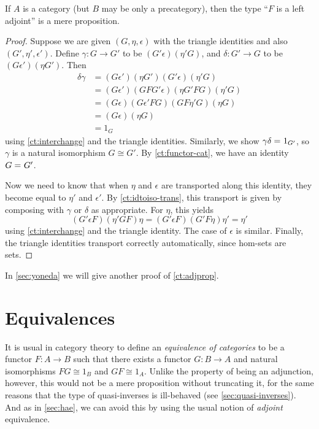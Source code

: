 \begin{lem}\label{ct:adjprop}
  If $A$ is a category (but $B$ may be only a precategory), then the type ``$F$ is a left adjoint'' is a mere proposition.
\end{lem}
\begin{proof}
  Suppose we are given $(G,\eta,\epsilon)$ with the triangle identities and also $(G',\eta',\epsilon')$.
  Define $\gamma:G\to G'$ to be $(G'\epsilon)(\eta' G)$, and $\delta:G'\to G$ to be $(G\epsilon')(\eta G')$.
  Then
  \begin{align*}
    \delta\gamma &=
    (G\epsilon')(\eta G')(G'\epsilon)(\eta'G)\\
    &= (G\epsilon')(G F G'\epsilon)(\eta G' F G)(\eta'G)\\
    &= (G\epsilon)(G\epsilon'FG)(G F \eta' G)(\eta G)\\
    &= (G\epsilon)(\eta G)\\
    &= 1_G
  \end{align*}
  using \cref{ct:interchange} and the triangle identities.
  Similarly, we show $\gamma\delta =_{} 1_{G'}$, so $\gamma$ is a natural isomorphism $G\cong G'$.
  By \cref{ct:functor-cat}, we have an identity $G =_{} G'$.

  Now we need to know that when $\eta$ and $\epsilon$ are transported along this identity, they become equal to $\eta'$ and $\epsilon'$.
  By \cref{ct:idtoiso-trans}, this transport is given by composing with $\gamma$ or $\delta$ as appropriate.
  For $\eta$, this yields
  \begin{equation*}
    (G'\epsilon F)(\eta'GF)\eta
    = (G'\epsilon F)(G'F\eta)\eta'
    = \eta'
  \end{equation*}
  using \cref{ct:interchange} and the triangle identity.
  The case of $\epsilon$ is similar.
  Finally, the triangle identities transport correctly automatically, since hom-sets are sets.
\end{proof}

In \cref{sec:yoneda} we will give another proof of \cref{ct:adjprop}.


\section{Equivalences}
\label{sec:equivalences}

It is usual in category theory to define an \emph{equivalence of categories} to be a functor $F:A\to B$ such that there exists a functor $G:B\to A$ and natural isomorphisms $F G \cong 1_B$ and $G F \cong 1_A$.
Unlike the property of being an adjunction, however, this would not be a mere proposition without truncating it, for the same reasons that the type of quasi-inverses is ill-behaved (see \cref{sec:quasi-inverses}).
And as in \cref{sec:hae}, we can avoid this by using the usual notion of \emph{adjoint} equivalence.

